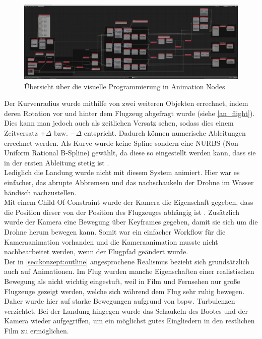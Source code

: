 \begin{figure}[H]
\begin{center}
\includegraphics[width=\textwidth]{gfx/prod/plane/animation_nodes.jpg}
\caption{Übersicht über die visuelle Programmierung in Animation Nodes}
\label{animation_nodes}
\end{center}
\end{figure}
\noindent
Der Kurvenradius wurde mithilfe von zwei weiteren Objekten errechnet, indem deren Rotation vor und hinter dem Flugzeug abgefragt wurde (siehe \autoref{an_flight}). Dies kann man jedoch auch als zeitlichen Versatz sehen, sodass dies einem Zeitversatz $+\Delta$ bzw. $-\Delta$ entspricht. Dadurch können numerische Ableitungen errechnet werden.
Als Kurve wurde keine Spline sondern eine NURBS (Non-Uniform Rational B-Spline) gewählt, da diese so eingestellt werden kann, dass sie in der ersten Ableitung stetig ist .\\
Lediglich die Landung wurde nicht mit diesem System animiert. Hier war es einfacher, das abrupte Abbremsen und das nachschaukeln der Drohne im Wasser händisch nachzustellen.\\
Mit einem Child-Of-Constraint wurde der Kamera die Eigenschaft gegeben, dass die Position dieser von der Position des Flugzeuges abhängig ist .
Zusätzlich wurde der Kamera eine Bewegung über Keyframes gegeben, damit sie sich um die Drohne herum bewegen kann. Somit war ein einfacher Workflow für die Kameraanimation vorhanden und die Kameraanimation musste nicht nachbearbeitet werden, wenn der Flugpfad geändert wurde.\\

Der in \autoref{sec:konzept:outline} angesprochene Realismus bezieht sich grundsätzlich auch auf Animationen. Im Flug wurden manche Eigenschaften einer realistischen Bewegung als nicht wichtig eingestuft, weil in Film und Fernsehen nur große Flugzeuge gezeigt werden, welche sich während dem Flug sehr ruhig bewegen. Daher wurde hier auf starke Bewegungen aufgrund von bspw. Turbulenzen verzichtet. Bei der Landung hingegen wurde das Schaukeln des Bootes und der Kamera wieder aufgegriffen, um ein möglichst gutes Eingliedern in den restlichen Film zu ermöglichen.

